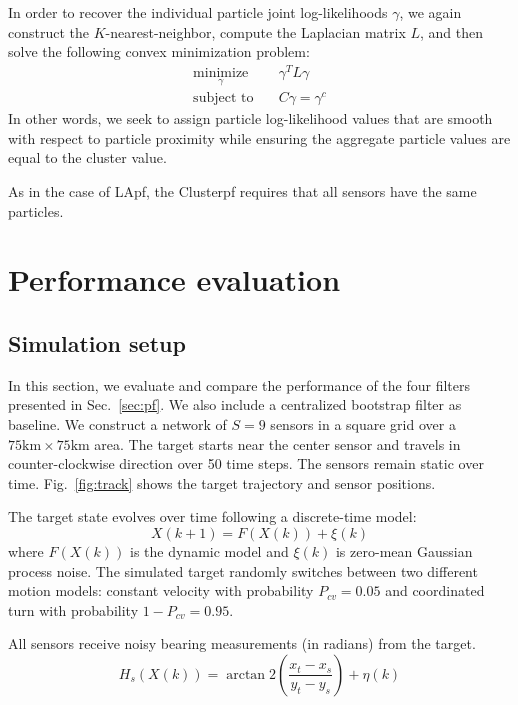 \documentclass[10pt,letterpaper,final]{article}
\begin{document}
In order to recover the individual particle joint log-likelihoods $\gamma$, we again construct the $K$-nearest-neighbor, compute the Laplacian matrix $L$, and then solve the following convex minimization problem:
\begin{align*}
\underset{\gamma}{\text{minimize}}& \quad \gamma^TL\gamma  \\
\text{subject to}& \quad C\gamma = \gamma^c
\end{align*}
In other words, we seek to assign particle log-likelihood values that are smooth with respect to particle proximity while ensuring the aggregate particle values are equal to the cluster value. 

As in the case of LApf, the Clusterpf requires that all sensors have the same particles. 

\section{Performance evaluation}
\subsection{Simulation setup}
In this section, we evaluate and compare the performance of the four filters presented in Sec.~\ref{sec:pf}. We also include a centralized bootstrap filter as baseline. We construct a network of $S=9$ sensors in a square grid over a $75\text{km} \times 75\text{km}$ area. The target starts near the center sensor and travels in counter-clockwise direction over 50 time steps. The sensors remain static over time. Fig.~\ref{fig:track} shows the target trajectory and sensor positions. 

The target state evolves over time following a discrete-time model:
\begin{equation}
X(k+1) = F(X(k))+\xi(k)
\end{equation}
where $F(X(k))$ is the dynamic model and $\xi(k)$ is zero-mean Gaussian process noise. The simulated target randomly switches between two different motion models: constant velocity with probability $P_{cv} = 0.05$ and coordinated turn with probability $1-P_{cv}=0.95$. 

All sensors receive noisy bearing measurements (in radians) from the target.
\begin{equation}
H_s(X(k))= \arctan2 \left( \frac{x_t-x_s}{y_t-y_s} \right) + \eta(k)
\end{equation}
\end{document}
